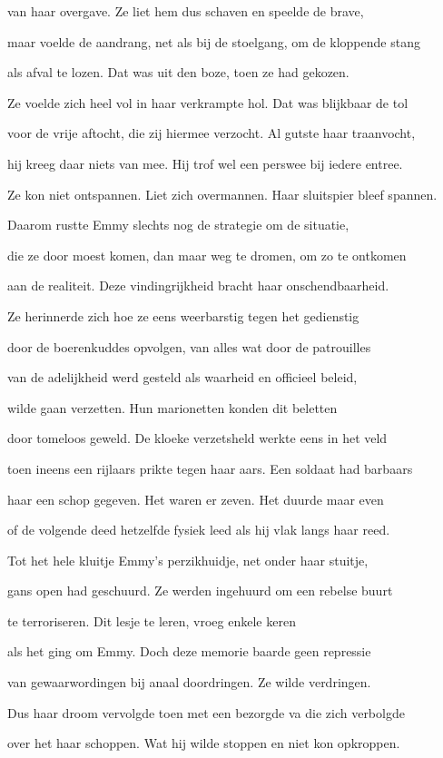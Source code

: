 van haar overgave.
Ze liet hem dus schaven
en speelde de brave,

maar voelde de aandrang,
net als bij de stoelgang,
om de kloppende stang

als afval te lozen.
Dat was uit den boze,
toen ze had gekozen.

Ze voelde zich heel vol
in haar verkrampte hol.
Dat was blijkbaar de tol

voor de vrije aftocht,
die zij hiermee verzocht.
Al gutste haar traanvocht,

hij kreeg daar niets van mee.
Hij trof wel een perswee
bij iedere entree.

Ze kon niet ontspannen.
Liet zich overmannen.
Haar sluitspier bleef spannen.

Daarom rustte Emmy
slechts nog de strategie
om de situatie,

die ze door moest komen,
dan maar weg te dromen,
om zo te ontkomen

aan de realiteit.
Deze vindingrijkheid
bracht haar onschendbaarheid.

Ze herinnerde zich
hoe ze eens weerbarstig
tegen het gedienstig

door de boerenkuddes opvolgen, van alles
wat door de patrouilles

van de adelijkheid
werd gesteld als waarheid
en officieel beleid,

wilde gaan verzetten.
Hun marionetten
konden dit beletten

door tomeloos geweld.
De kloeke verzetsheld
werkte eens in het veld

toen ineens een rijlaars
prikte tegen haar aars.
Een soldaat had barbaars

haar een schop gegeven.
Het waren er zeven.
Het duurde maar even

of de volgende deed
hetzelfde fysiek leed
als hij vlak langs haar reed.

Tot het hele kluitje
Emmy’s perzikhuidje,
net onder haar stuitje,

gans open had geschuurd.
Ze werden ingehuurd
om een rebelse buurt

te terroriseren.
Dit lesje te leren,
vroeg enkele keren

als het ging om Emmy.
Doch deze memorie
baarde geen repressie

van gewaarwordingen
bij anaal doordringen.
Ze wilde verdringen.

Dus haar droom vervolgde
toen met een bezorgde
va die zich verbolgde

over het haar schoppen.
Wat hij wilde stoppen
en niet kon opkroppen.

